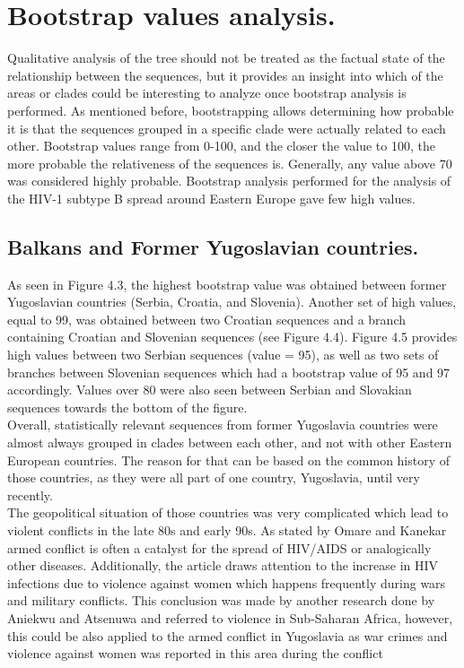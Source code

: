 \section{Bootstrap values analysis.}

Qualitative analysis of the tree should not be treated as the factual state of the relationship between the sequences, but it provides an insight into which of the areas or clades could be interesting to analyze once bootstrap analysis is performed.
As mentioned before, bootstrapping allows determining how probable it is that the sequences grouped in a specific clade were actually related to each other.
Bootstrap values range from 0-100, and the closer the value to 100, the more probable the relativeness of the sequences is.
Generally, any value above 70 was considered highly probable.
Bootstrap analysis performed for the analysis of the HIV-1 subtype B spread around Eastern Europe gave few high values. 


\subsection{Balkans and Former Yugoslavian countries.}

As seen in Figure 4.3, the highest bootstrap value was obtained between former Yugoslavian countries (Serbia, Croatia, and Slovenia).  
Another set of high values, equal to 99, was obtained between two Croatian sequences and a branch containing Croatian and Slovenian sequences (see Figure 4.4). 
Figure 4.5 provides high values between two Serbian sequences (value = 95), as well as two sets of branches between Slovenian sequences which had a bootstrap value of 95 and 97 accordingly. 
Values over 80 were also seen between Serbian and Slovakian sequences towards the bottom of the figure. \\
Overall, statistically relevant sequences from former Yugoslavia countries were almost always grouped in clades between each other, and not with other Eastern European countries. 
The reason for that can be based on the common history of those countries, as they were all part of one country, Yugoslavia, until very recently. \\
The geopolitical situation of those countries was very complicated which lead to violent conflicts in the late 80s and early 90s. 
As stated by Omare and Kanekar \cite{kanekar_2011_determinants}armed conflict is often a catalyst for the spread of HIV/AIDS or analogically other diseases. 
Additionally, the article draws attention to the increase in HIV infections due to violence against women which happens frequently during wars and military conflicts. 
This conclusion was made by another research done by Aniekwu and Atsenuwa \cite{ijeomaaniekwu_2007_sexual} and referred to violence in Sub-Saharan Africa, however, this could be also applied to the armed conflict in Yugoslavia as war crimes and violence against women was reported in this area during the conflict \cite{stojsavljevic_1995_women}

